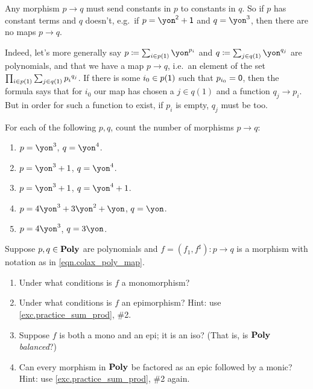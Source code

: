 \documentclass[DynamicalBook]{subfiles}
\begin{document}
\begin{example}\label{ex.const_to_const}
Any morphism $p\to q$ must send constants in $p$ to constants in $q$. So if $p$ has constant terms and $q$ doesn't, e.g.\ if $p=\yon^\2+\1$ and $q=\yon^3$, then there are no maps $p\to q$. 

Indeed, let's more generally say $p\coloneqq\sum_{i\in p(\1)}\yon^{p_i}$ and $q\coloneqq\sum_{j\in q(\1)}\yon^{q_j}$ are polynomials, and that we have a map $p\to q$, i.e.\ an element of the set $\prod_{i\in p(\textsf{1})}\sum_{j\in q(\textsf{1})}{p_i}^{q_j}$. If there is some $i_0\in p(\textsf{1})$ such that $p_{i_0}=\textsf{0}$, then the formula says that for $i_0$ our map has chosen a $j\in q(1)$ and a function $q_j\to p_i$. But in order for such a function to exist, if $p_i$ is empty, $q_j$ must be too.
\end{example}

\begin{exercise}
For each of the following $p,q$, count the number of morphisms $p\to q$:
\begin{enumerate}
	\item $p=\yon^3$, $q=\yon^4$.
	\item $p=\yon^3+1$, $q=\yon^4$.
	\item $p=\yon^3+1$, $q=\yon^4+1$.
	\item $p=4\yon^3+3\yon^2+\yon$, $q=\yon$.
	\item $p=4\yon^3$, $q=3\yon$.
\qedhere
\end{enumerate}
\end{exercise}

\begin{exercise}\label{exc.mono_epi_poly}
Suppose $p,q\in\textbf{Poly}$ are polynomials and $f=(f_1,f^\sharp)\colon p\to q$ is a morphism with notation as in \cref{eqn.colax_poly_map}.
\begin{enumerate}
	\item Under what conditions is $f$ a monomorphism?
	\item Under what conditions is $f$ an epimorphism? Hint: use \cref{exc.practice_sum_prod}, \#2.
	\item Suppose $f$ is both a mono and an epi; it is an iso? (That is, is $\textbf{Poly}$ \emph{balanced}?)
	\item Can every morphism in $\textbf{Poly}$ be factored as an epic followed by a monic? Hint: use \cref{exc.practice_sum_prod}, \#2 again.
\qedhere
\end{enumerate}
\end{exercise}
\end{document}

